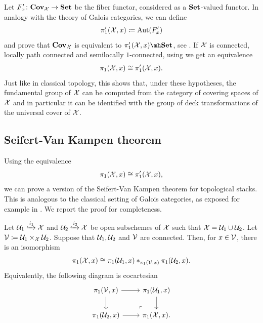 Let $F'_x \colon \mathbf{Cov}_{\mathcal{X}} \to \mathbf{Set}$ be the fiber functor, considered as a $\mathbf{Set}$-valued functor. In analogy with the theory of Galois categories, we can define
\[
\pi'_1(\mathcal{X}, x) \coloneqq \operatorname{Aut}(F'_x)
\]
and prove that $\mathbf{Cov}_{\mathcal{X}}$ is equivalent to $\pi'_1(\mc{X}, x)\mh\Set$, see \cite[Remark 18.22]{Noohi-foundations}. If $\mathcal{X}$ is connected, locally path connected and semilocally $1$-connected, using  we get an equivalence
\[
\pi_1(\mathcal{X}, x) \cong \pi'_1(\mathcal{X}, x).
\]
Just like in classical topology, this shows that, under these hypotheses, the fundamental group of $\mathcal{X}$ can be computed from the category of covering spaces of $\mathcal{X}$ and in particular it can be identified with the group of deck transformations of the universal cover of $\mathcal{X}$.

\subsection{Seifert-Van Kampen theorem}
Using the equivalence
\[
\pi_1(\mathcal{X}, x) \cong \pi'_1(\mathcal{X}, x),
\]
we can prove a version of the Seifert-Van Kampen theorem for topological stacks. This is analogous to the classical setting of Galois categories, as exposed for example in \cite[Theorem 4.7.7]{Douady2020}. We report the proof for completeness.

\begin{thm}\label{van kampen}
Let $\mathcal{U}_1 \xhookrightarrow{i_1} \mathcal{X}$ and $\mathcal{U}_2 \xhookrightarrow{i_2} \mathcal{X}$ be open subschemes of $\mathcal{X}$ such that $\mathcal{X} = \mathcal{U}_1 \cup \mathcal{U}_2$. Let $\mathcal{V} \coloneqq \mathcal{U}_1 \times_{\mathcal{X}} \mathcal{U}_2$. Suppose that $\mathcal{U}_1, \mathcal{U}_2$ and $\mathcal{V}$ are connected. Then, for $x \in \mathcal{V}$, there is an isomorphism
\[
\pi_1(\mathcal{X}, x) \cong \pi_1(\mathcal{U}_1, x) *_{\pi_1(\mathcal{V}, x)} \pi_1(\mathcal{U}_2, x).
\]
Equivalently, the following diagram is cocartesian
\[\begin{tikzcd}
	{{\pi_1(\mc{V}, x)}} & {\pi_1(\mc{U}_1, x)} \\
	{\pi_1(\mc{U}_2, x)} & {\pi_1(\mc{X}, x).}
	\arrow[from=1-1, to=1-2]
	\arrow[from=1-1, to=2-1]
	\arrow[from=1-2, to=2-2]
	\arrow[from=2-1, to=2-2]
	\arrow["\lrcorner"{anchor=center, pos=0.125, rotate=180}, draw=none, from=2-2, to=1-1]
\end{tikzcd}\]
\end{thm}

